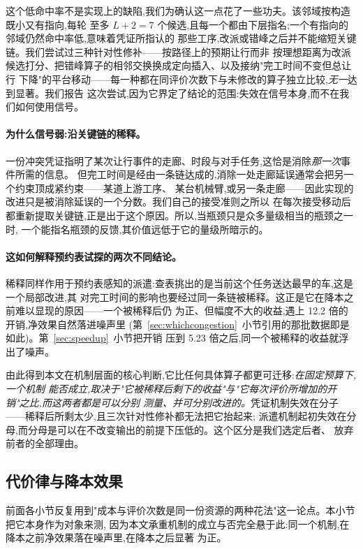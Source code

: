 \documentclass[manuscript,screen,review]{acmart}
\newcommand{\CostMultBefore}{12.2}
\newcommand{\CostMultAfter}{5.23}
\begin{document}
这个低命中率不是实现上的缺陷,我们为确认这一点花了一些功夫。该邻域按构造既小又有指向,每轮
至多 $L+2=7$ 个候选,且每一个都由下层指名;一个有指向的邻域仍然命中率低,意味着凭证所指认的
那些工序,改派或错峰之后并不能缩短关键链。我们尝试过三种针对性修补——按路径上的预期让行而非
按理想距离为改派候选打分、把错峰算子的相邻交换换成定向插入、以及接纳"完工时间不变但总让行
下降"的平台移动——每一种都在同评价次数下与未修改的算子独立比较,\emph{无一}达到显著。我们报告
这次尝试,因为它界定了结论的范围:失效在信号本身,而不在我们如何使用信号。

\paragraph{为什么信号弱:沿关键链的稀释。}
一份冲突凭证指明了某次让行事件的走廊、时段与对手任务,这恰是消除\emph{那一次}事件所需的信息。
但完工时间是经由一条链达成的,消除一处走廊延误通常会把另一个约束顶成紧约束——某道上游工序、
某台机械臂,或另一条走廊——因此实现的改进只是被消除延误的一个分数。我们自己的接受准则之所以
在每次接受移动后都重新提取关键链,正是出于这个原因。所以,当瓶颈只是众多量级相当的瓶颈之一时,
一个能指名瓶颈的反馈,其价值远低于它的量级所暗示的。

\paragraph{这如何解释预约表试探的两次不同结论。}
稀释同样作用于预约表感知的派遣:查表挑出的是当前这个任务送达最早的车,这是一个局部改进,其
对完工时间的影响也要经过同一条链被稀释。这正是它在降本之前难以显现的原因——一个被稀释后仍
为正、但幅度不大的收益,遇上 \CostMultBefore{} 倍的开销,净效果自然落进噪声里
(第~\ref{sec:whichcongestion}~小节引用的那批数据即是如此)。第~\ref{sec:speedup}~小节把开销
压到 \CostMultAfter{} 倍之后,同一个被稀释的收益就浮出了噪声。

由此得到本文在机制层面的核心判断,它比任何具体算子都更可迁移:\emph{在固定预算下,一个机制
能否成立,取决于"它被稀释后剩下的收益"与"它每次评价所增加的开销"之比,而这两者都是可以分别
测量、并可分别改进的。}凭证机制失效在分子——稀释后所剩太少,且三次针对性修补都无法把它抬起来;
派遣机制起初失效在分母,而分母是可以在不改变输出的前提下压低的。这个区分是我们选定后者、
放弃前者的全部理由。

\subsection{代价律与降本效果}
\label{sec:costlaw}

前面各小节反复用到"成本与评价次数是同一份资源的两种花法"这一论点。本小节把它本身作为对象来测,
因为本文承重机制的成立与否完全悬于此:同一个机制,在降本之前净效果落在噪声里,在降本之后显著
为正。
\end{document}
